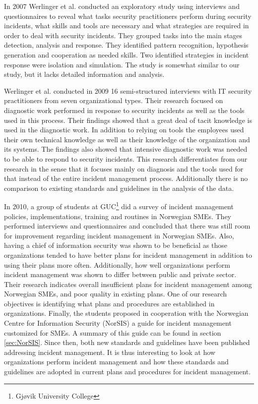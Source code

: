 In 2007 Werlinger et al. \cite{werlinger2007detecting} conducted an exploratory study using interviews and questionnaires to reveal what tasks security practitioners perform during security incidents, what skills and tools are necessary and what strategies are required in order to deal with security incidents. They grouped tasks into the main stages detection, analysis and response. They identified pattern recognition, hypothesis generation and cooperation as needed skills. Two identified strategies in incident response were isolation and simulation. The study is somewhat similar to our study, but it lacks detailed information and analysis.

Werlinger et al. \cite{werlinger2010preparation} conducted in 2009 16 semi-structured interviews with IT security practitioners from seven organizational types. Their research focused on diagnostic work performed in response to security incidents as well as the tools used in this process. Their findings showed that a great deal of tacit knowledge is used in the diagnostic work. In addition to relying on tools the employees used their own technical knowledge as well as their knowledge of the organization and its systems. The findings also showed that intensive diagnostic work was needed to be able to respond to security incidents. This research differentiates from our research in the sense that it focuses mainly on diagnosis and the tools used for that instead of the entire incident management process. Additionally there is no comparison to existing standards and guidelines in the analysis of the data.

In 2010, a group of students at GUC\footnote{Gj\o vik University College} did a survey of incident management policies, implementations, training and routines in Norwegian \acp{SME}\cite{sand2010hendelseshaandtering}. They performed interviews and questionnaires and concluded that there was still room for improvement regarding incident management in Norwegian \acp{SME}. Also, having a chief of information security was shown to be beneficial as those organizations tended to have better plans for incident management in addition to using their plans more often. Additionally, how well organizations perform incident management was shown to differ between public and private sector. Their research indicates overall insufficient plans for incident management among Norwegian \acp{SME}, and poor quality in existing plans. One of our research objectives is identifying what plans and procedures are established in organizations. Finally, the students proposed in cooperation with the Norwegian Centre for Information Security (NorSIS) a guide for incident management customized for \acp{SME}. A summary of this guide can be found in section \ref{sec:NorSIS}. Since then, both new standards and guidelines have been published addressing incident management. It is thus interesting to look at how organizations perform incident management and how these standards and guidelines are adopted in current plans and procedures for incident management.

